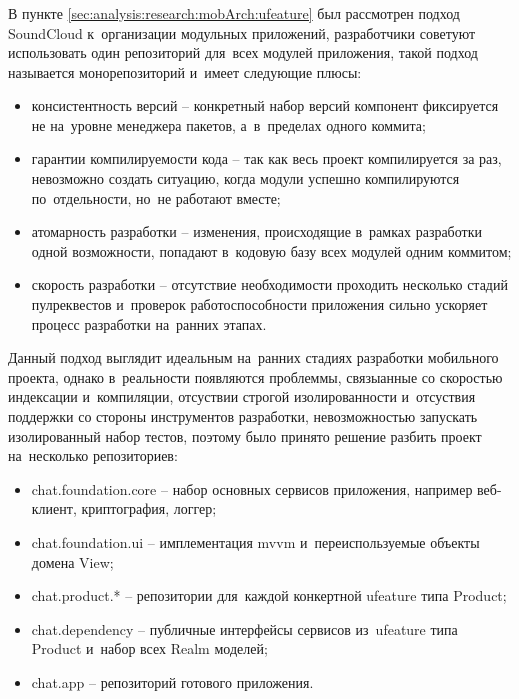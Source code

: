 \subsubsection{}
\label{sec:development:arch:ios:ufeature}

В пункте \ref{sec:analysis:research:mobArch:ufeature} был рассмотрен подход SoundCloud к~организации модульных приложений, разработчики советуют использовать один репозиторий для~всех модулей приложения, такой подход называется монорепозиторий и~имеет следующие плюсы:

\begin{itemize}
\item консистентность версий -- конкретный набор версий компонент фиксируется не на~уровне менеджера пакетов, а~в~пределах одного коммита;
\item гарантии компилируемости кода -- так как весь проект компилируется за раз, невозможно создать ситуацию, когда модули успешно компилируются по~отдельности, но~не работают вместе;
\item атомарность разработки -- изменения, происходящие в~рамках разработки одной возможности, попадают в~кодовую базу всех модулей одним коммитом;
\item скорость разработки -- отсутствие необходимости проходить несколько стадий пулреквестов и~проверок работоспособности приложения сильно ускоряет процесс разработки на~ранних этапах.
\end{itemize}

Данный подход выглядит идеальным на~ранних стадиях разработки мобильного проекта, однако в~реальности появляются проблеммы, связыанные со скоростью индексации и~компиляции, отсуствии строгой изолированности и~отсуствия поддержки со стороны инструментов разработки, невозможностью запускать изолированный набор тестов, поэтому было принято решение разбить проект на~несколько репозиториев:

\begin{itemize}
\item chat.foundation.core -- набор основных сервисов приложения, например веб-клиент, криптография, логгер;
\item chat.foundation.ui -- имплементация \gls{mvvm} и~переиспользуемые объекты домена View;
\item chat.product.* -- репозитории для~каждой конкертной \gls{ufeature} типа Product;
\item chat.dependency -- публичные интерфейсы сервисов из~\gls{ufeature} типа Product и~набор всех Realm моделей;
\item chat.app -- репозиторий готового приложения.
\end{itemize}

